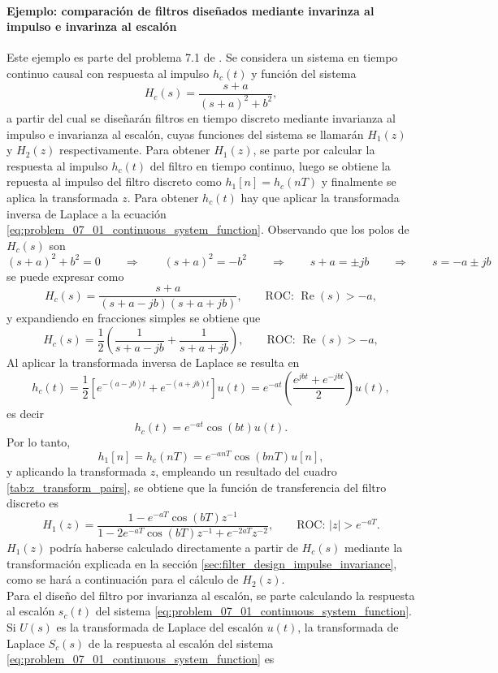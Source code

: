 \documentclass[a4paper]{report}
\renewcommand{\Re}{\operatorname{Re}}
\begin{document}
\paragraph{Ejemplo: comparación de filtros diseñados mediante invarinza al impulso e invarinza al escalón} Este ejemplo es parte del problema 7.1 de \cite{oppenheim2009discrete}. Se considera un sistema en tiempo continuo causal con respuesta al impulso \(h_c(t)\) y función del sistema 
\begin{equation}\label{eq:problem_07_01_continuous_system_function}
 H_c(s)=\frac{s+a}{(s+a)^2+b^2}, 
\end{equation}
a partir del cual se diseñarán filtros en tiempo discreto mediante invarianza al impulso e invarianza al escalón, cuyas funciones del sistema se llamarán \(H_1(z)\) y \(H_2(z)\) respectivamente. Para obtener \(H_1(z)\), se parte por calcular la respuesta al impulso \(h_c(t)\) del filtro en tiempo continuo, luego se obtiene la repuesta al impulso del filtro discreto como \(h_1[n]=h_c(nT)\) y finalmente se aplica la transformada \(z\). Para obtener \(h_c(t)\) hay que aplicar la transformada inversa de Laplace a la ecuación \ref{eq:problem_07_01_continuous_system_function}. Observando que los polos de \(H_c(s)\) son 
\[
 (s+a)^2+b^2=0
 \qquad\Rightarrow\qquad
 (s+a)^2=-b^2
 \qquad\Rightarrow\qquad
 s+a=\pm jb
 \qquad\Rightarrow\qquad
 s=-a\pm jb
\]
se puede expresar como
\[
 H_c(s)=\frac{s+a}{(s+a-jb)(s+a+jb)}, 
 \qquad\textrm{ROC: }\Re(s)>-a,
\]
y expandiendo en fracciones simples se obtiene que 
\[
 H_c(s)=\frac{1}{2}\left(\frac{1}{s+a-jb}+\frac{1}{s+a+jb}\right),
 \qquad\textrm{ROC: }\Re(s)>-a,
\]
Al aplicar la transformada inversa de Laplace se resulta en
\[
 h_c(t)=\frac{1}{2}\left[e^{-(a-jb)t}+e^{-(a+jb)t}\right]u(t)
  =e^{-at}\left(\frac{e^{jbt}+e^{-jbt}}{2}\right)u(t),
\]
es decir
\[
 h_c(t)=e^{-at}\cos(bt)u(t).
\]
Por lo tanto,
\[
 h_1[n]=h_c(nT)=e^{-anT}\cos(bnT)u[n],
\]
y aplicando la transformada \(z\), empleando un resultado del cuadro \ref{tab:z_transform_pairs}, se obtiene que la función de transferencia del filtro discreto es
\[
 H_1(z)=\dfrac{1-e^{-aT}\cos(bT)z^{-1}}{1-2e^{-aT}\cos(bT)z^{-1}+e^{-2aT}z^{-2}},
 \qquad\textrm{ROC: }|z|>e^{-aT}.
\]
\(H_1(z)\) podría haberse calculado directamente a partir de \(H_c(s)\) mediante la transformación explicada en la sección \ref{sec:filter_design_impulse_invariance}, como se hará a continuación para el cálculo de \(H_2(z)\).
\\
Para el diseño del filtro por invarianza al escalón, se parte calculando la respuesta al escalón \(s_c(t)\) del sistema \ref{eq:problem_07_01_continuous_system_function}. Si \(U(s)\)  es la transformada de Laplace del escalón \(u(t)\), la transformada de Laplace \(S_c(s)\) de la respuesta al escalón del sistema \ref{eq:problem_07_01_continuous_system_function} es
\end{document}
